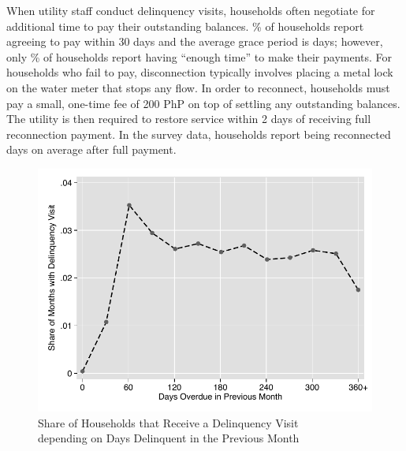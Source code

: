 \documentclass[12pt]{article}
\begin{document}
When utility staff conduct delinquency visits, households often negotiate for additional time to pay their outstanding balances.  \unskip\% of households report agreeing to pay within 30 days and the average grace period is days; however, only \unskip\% of households report having ``enough time'' to make their payments.  For households who fail to pay, disconnection typically involves placing a metal lock on the water meter that stops any flow.  In order to reconnect, households must pay a small, one-time fee of 200 PhP on top of settling any outstanding balances.  The utility is then required to restore service within 2 days of receiving full reconnection payment.  In the survey data, households report being reconnected days on average after full payment.

\begin{figure}
\centering
\caption{Share of Households that Receive a Delinquency Visit \\ depending on Days Delinquent in the Previous Month}\label{figure:dc_hazard}
\includegraphics[scale=.7]{tables/connected_visit_hazard_all.pdf}
\end{figure}
\end{document}
